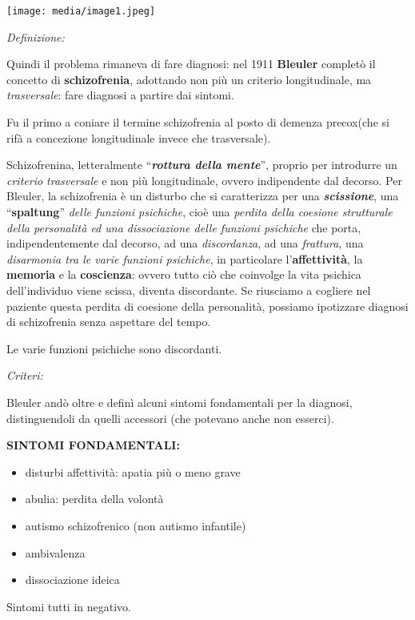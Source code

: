 \documentclass[]{article}
\begin{document}
\texttt{[image: media/image1.jpeg]}

\emph{\emph{Definizione:}}

Quindi il problema rimaneva di fare diagnosi: nel 1911 \textbf{Bleuler}
completò il concetto di \textbf{schizofrenia}, adottando non più un
criterio longitudinale, ma \emph{trasversale}: fare diagnosi a partire
dai sintomi.

Fu il primo a coniare il termine schizofrenia al posto di demenza
precox(che si rifà a concezione longitudinale invece che trasversale).

Schizofrenina, letteralmente ``\textbf{\emph{rottura della mente}}'',
proprio per introdurre un \emph{criterio trasversale} e non più
longitudinale, ovvero indipendente dal decorso. Per Bleuler, la
schizofrenia è un disturbo che si caratterizza per una
\textbf{\emph{scissione}}, una ``\textbf{spaltung}'' \emph{delle
funzioni psichiche}, cioè una \emph{perdita della coesione strutturale
della personalità ed una dissociazione delle funzioni psichiche} che
porta, indipendentemente dal decorso, ad una \emph{discordanza}, ad una
\emph{frattura}, una \emph{disarmonia tra le varie funzioni psichiche},
in particolare l'\textbf{affettività}, la \textbf{memoria} e la
\textbf{coscienza}: ovvero tutto ciò che coinvolge la vita psichica
dell'individuo viene scissa, diventa discordante. Se riusciamo a
cogliere nel paziente questa perdita di coesione della personalità,
possiamo ipotizzare diagnosi di schizofrenia senza aspettare del tempo.

Le varie funzioni psichiche sono discordanti.

\emph{\emph{Criteri:}}

Bleuler andò oltre e definì alcuni sintomi fondamentali per la diagnosi,
distinguendoli da quelli accessori (che potevano anche non esserci).

\textbf{SINTOMI FONDAMENTALI:}

\begin{itemize}
\item
  disturbi affettività: apatia più o meno grave
\item
  abulia: perdita della volontà
\item
  autismo schizofrenico (non autismo infantile)
\item
  ambivalenza
\item
  dissociazione ideica
\end{itemize}

Sintomi tutti in negativo.
\end{document}

